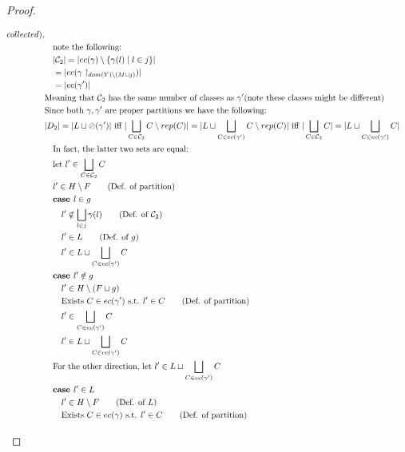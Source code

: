 \documentclass{easychair}
\newcommand{\oh}[1]{\oslash(#1)}
\theoremstyle{definition}
\begin{document}
\begin{proof}
\begin{description}
\begin{align*}
{		collected), }\\
		&\quad \text{note the following: }\\
		&\quad |\mathcal{C}_2| = |ec(\gamma) \setminus \{\gamma(l) \mid l \in j\}|\\
		&\quad = |ec(\gamma \restriction_{dom(Y) \setminus (M \sqcup j)})|\\
		&\quad = |ec(\gamma')|\\
		&\text{Meaning that } \mathcal{C}_2 \text{ has the same number of classes as } \gamma' 
			\text{(note these classes might be different)}\\
		&\text{Since both } \gamma,\gamma' \text{ are proper partitions we have the following: }\\
		&|D_2| = |L \sqcup \oh{\gamma'}| \text{ iff } 
			|\bigsqcup_{C  \in \mathcal{C}_2} C \setminus rep(C)| =
			|L \sqcup \bigsqcup_{C \in ec(\gamma')} C \setminus rep(C)|
			\text{ iff }
		|\bigsqcup_{C  \in \mathcal{C}_2} C| = |L \sqcup \bigsqcup_{C \in ec(\gamma')} C|\\ 
		&\quad \text{In fact, the latter two sets are equal: }\\
		&\quad \text{let } l' \in \bigsqcup_{C  \in \mathcal{C}_2} C\\
		&\quad l' \in H \setminus F \tag{Def. of partition}\\
		&\quad \textbf{case } l \in g\\
		&\quad\quad l' \notin \bigsqcup_{l \in j} \gamma(l) \tag{Def. of $\mathcal{C}_2$}\\
		&\quad\quad l' \in L \tag{Def. of $g$}\\
		&\quad\quad l' \in L \sqcup \bigsqcup_{C \in ec(\gamma')} C\\
		&\quad \textbf{case } l' \notin g\\
		&\quad\quad l' \in H \setminus (F \sqcup g)\\
		&\quad\quad \text{Exists } C \in ec(\gamma') \text{ s.t. } l' \in C \tag{Def. of partition}\\
		&\quad\quad l' \in \bigsqcup_{C \in ec(\gamma')} C\\
		&\quad\quad l' \in L \sqcup \bigsqcup_{C \in ec(\gamma')} C\\
		&\quad\text{For the other direction, let } l' \in L \sqcup \bigsqcup_{C \in ec(\gamma')} C\\
		&\quad\textbf{case } l' \in L\\
		&\quad\quad l' \in H \setminus F \tag{Def. of $L$}\\
		&\quad\quad \text{Exists } C \in ec(\gamma) \text{ s.t. } l' \in C \tag{Def. of partition}\\

\end{align*}
\end{description}
\end{proof}
\end{document}
